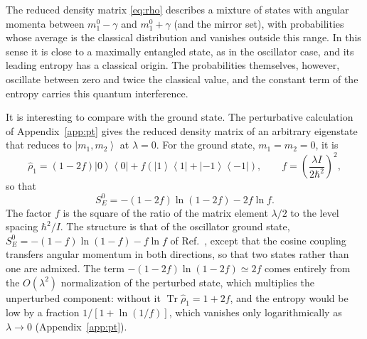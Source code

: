 \documentclass[aps,preprint,12pt,superscriptaddress,nofootinbib]{revtex4-2}
\newcommand{\Tr}{\operatorname{Tr}}
\newcommand{\ket}[1]{\left|#1\right\rangle}
\newcommand{\ketbra}[2]{\left|#1\right\rangle\!\left\langle#2\right|}
\begin{document}
The reduced density matrix \eqref{eq:rho} describes a mixture of states with angular
momenta between $m_{1}^{0}-\gamma$ and $m_{1}^{0}+\gamma$ (and the mirror set), with
probabilities whose average is the classical distribution and vanishes outside this
range. In this sense it is close to a maximally entangled state, as in the
oscillator case, and its leading entropy has a classical origin. The probabilities
themselves, however, oscillate between zero and twice the classical value, and the
constant term of the entropy carries this quantum interference.

It is interesting to compare with the ground state. The perturbative calculation of
Appendix~\ref{app:pt} gives the reduced density matrix of an arbitrary eigenstate
that reduces to $\ket{m_{1},m_{2}}$ at $\lambda=0$. For the ground state,
$m_{1}=m_{2}=0$, it is
\begin{equation}
\hat\rho_{1}=(1-2f)\ketbra00+f\left(\ketbra11+\ketbra{-1}{-1}\right),\qquad
f=\left(\frac{\lambda I}{2\hbar^{2}}\right)^{2},
\label{eq:rho0}
\end{equation}
so that
\begin{equation}
S^{0}_{E}=-(1-2f)\ln(1-2f)-2f\ln f .
\label{eq:S0}
\end{equation}
The factor $f$ is the square of the ratio of the matrix element $\lambda/2$ to the
level spacing $\hbar^{2}/I$. The structure is that of the oscillator ground state,
$S^{0}_{E}=-(1-f)\ln(1-f)-f\ln f$ of Ref.~\cite{DKS}, except that the cosine
coupling transfers angular momentum in both directions, so that two states rather
than one are admixed. The term $-(1-2f)\ln(1-2f)\simeq2f$ comes entirely from the
$O(\lambda^{2})$ normalization of the perturbed state, which multiplies the
unperturbed component: without it $\Tr\hat\rho_{1}=1+2f$, and the entropy would be
low by a fraction $1/[1+\ln(1/f)]$, which vanishes only logarithmically as
$\lambda\to0$ (Appendix~\ref{app:pt}).
\end{document}
